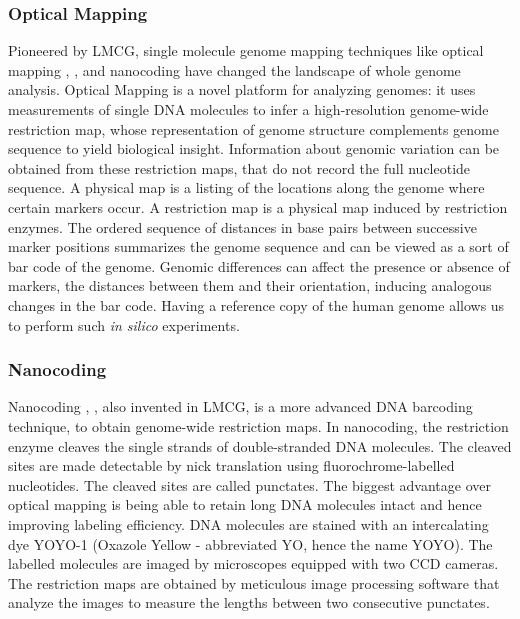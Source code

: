 \subsubsection*{Optical Mapping}
Pioneered by LMCG, single molecule genome mapping techniques like optical mapping \cite{Schwartz_etal_1993_Science}, \cite{Dimalanta_etal_2004_AnalChem}, and nanocoding \cite{Jo_etal_2007_PNAS} have changed the landscape of whole genome analysis. Optical Mapping is a novel platform for analyzing genomes: it uses measurements of single DNA molecules to infer a high-resolution genome-wide restriction map, whose representation of genome structure complements genome sequence to yield biological insight. Information about genomic variation can be obtained from these restriction maps, that do not record the full nucleotide sequence. A physical map is a listing of the locations along the genome where certain markers occur. A restriction map is a physical map induced by restriction enzymes. The ordered sequence of distances in base pairs between successive marker positions summarizes the genome sequence and can be viewed as a sort of bar code of the genome. Genomic differences can affect the presence or absence of markers, the distances between them and their orientation, inducing analogous changes in the bar code. Having a reference copy of the human genome allows us to perform such {\emph{in silico}} experiments. 

\subsubsection*{Nanocoding}
Nanocoding \cite{Jo_etal_2007_PNAS}, \cite{Jo_etal_2009}, also invented in LMCG, is a more advanced DNA barcoding technique, to obtain genome-wide restriction maps. In nanocoding, the restriction enzyme cleaves the single strands of double-stranded DNA molecules. The cleaved sites are made detectable by nick translation using fluorochrome-labelled nucleotides. The cleaved sites are called punctates. The biggest advantage over optical mapping is being able to retain long DNA molecules intact and hence improving labeling efficiency. DNA molecules are stained with an intercalating dye YOYO-1 (Oxazole Yellow - abbreviated YO, hence the name YOYO). The labelled molecules are imaged by microscopes equipped with two CCD cameras. The restriction maps are obtained by meticulous image processing software that analyze the images to measure the lengths between two consecutive punctates. 

